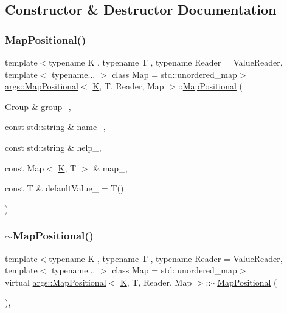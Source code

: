 \subsection{Constructor \& Destructor Documentation}
\mbox{\label{classargs_1_1_map_positional_a5ffc44de32246532effe895152e066bc}} 
\subsubsection{\texorpdfstring{Map\+Positional()}{MapPositional()}}
{\footnotesize\ttfamily template$<$typename K , typename T , typename Reader  = Value\+Reader, template$<$ typename... $>$ class Map = std\+::unordered\+\_\+map$>$ \\
\hyperlink{classargs_1_1_map_positional}{args\+::\+Map\+Positional}$<$ \hyperlink{cgal__test_8cpp_a891e241aa245ae63618f03737efba309}{K}, T, Reader, Map $>$\+::\hyperlink{classargs_1_1_map_positional}{Map\+Positional} (\begin{DoxyParamCaption}\item[{\hyperlink{classargs_1_1_group}{Group} \&}]{group\+\_\+,  }\item[{const std\+::string \&}]{name\+\_\+,  }\item[{const std\+::string \&}]{help\+\_\+,  }\item[{const Map$<$ \hyperlink{cgal__test_8cpp_a891e241aa245ae63618f03737efba309}{K}, T $>$ \&}]{map\+\_\+,  }\item[{const T \&}]{default\+Value\+\_\+ = {\ttfamily T()} }\end{DoxyParamCaption})\hspace{0.3cm}{\ttfamily [inline]}}

\mbox{\label{classargs_1_1_map_positional_a6ac22277778b53bfec47cc6e244ef29c}} 
\subsubsection{\texorpdfstring{$\sim$\+Map\+Positional()}{~MapPositional()}}
{\footnotesize\ttfamily template$<$typename K , typename T , typename Reader  = Value\+Reader, template$<$ typename... $>$ class Map = std\+::unordered\+\_\+map$>$ \\
virtual \hyperlink{classargs_1_1_map_positional}{args\+::\+Map\+Positional}$<$ \hyperlink{cgal__test_8cpp_a891e241aa245ae63618f03737efba309}{K}, T, Reader, Map $>$\+::$\sim$\hyperlink{classargs_1_1_map_positional}{Map\+Positional} (\begin{DoxyParamCaption}{ }\end{DoxyParamCaption})\hspace{0.3cm}{\ttfamily [inline]}, {\ttfamily [virtual]}}



